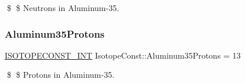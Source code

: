 \$ \$ Neutrons in Aluminum-\/35. \mbox{\label{group___isotope_const-_aluminum-_al35_gafae8e675176b3cc5ab8691021e92d017}} 
\subsubsection{\texorpdfstring{Aluminum35\+Protons}{Aluminum35Protons}}
{\footnotesize\ttfamily \mbox{\hyperlink{group___isotope_const-_macros_ga5f18360b3e99483a35c32d789e62621c}{I\+S\+O\+T\+O\+P\+E\+C\+O\+N\+S\+T\+\_\+\+I\+NT}} Isotope\+Const\+::\+Aluminum35\+Protons = 13}

\$ \$ Protons in Aluminum-\/35. 